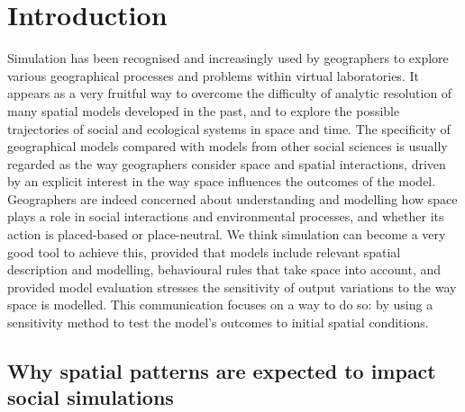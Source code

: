 \documentclass[Afour,sageh,times]{sagej}
\begin{document}

\maketitle




\section{Introduction}

Simulation has been recognised and increasingly used by geographers to explore various geographical processes and problems within virtual laboratories. It appears as a very fruitful way to overcome the difficulty of analytic resolution of many spatial models developed in the past, and to explore the possible trajectories of social and ecological systems in space and time. The specificity of geographical models compared with models from other social sciences is usually regarded as the way geographers consider space and spatial interactions, driven by an explicit interest in the way space influences the outcomes of the model. Geographers are indeed concerned about understanding and modelling how space plays a role in social interactions and environmental processes, and whether its action is placed-based or place-neutral. We think simulation can become a very good tool to achieve this, provided that models include relevant spatial description and modelling, behavioural rules that take space into account, and provided model evaluation  stresses the sensitivity of output variations to the way space is modelled. This communication focuses on a way to do  so: by using a sensitivity method to test the model's outcomes to initial spatial conditions.


\subsection{Why spatial patterns are expected to impact social simulations}
\end{document}
